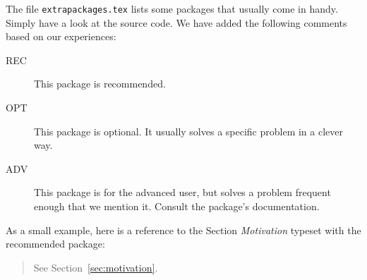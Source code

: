 The file \texttt{extrapackages.tex} lists some packages that usually
come in handy.  Simply have a look at the source code.  We have
added the following comments based on our experiences:
\begin{description}
\item[REC] This package is recommended.
\item[OPT] This package is optional.  It usually solves a specific
  problem in a clever way.
\item[ADV] This package is for the advanced user, but solves a problem
  frequent enough that we mention it. Consult the package's
  documentation.
\end{description}

As a small example, here is a reference to the Section \emph{Motivation}
typeset with the recommended  package:
\begin{quote}
  See Section~\vref{sec:motivation}.
\end{quote}
